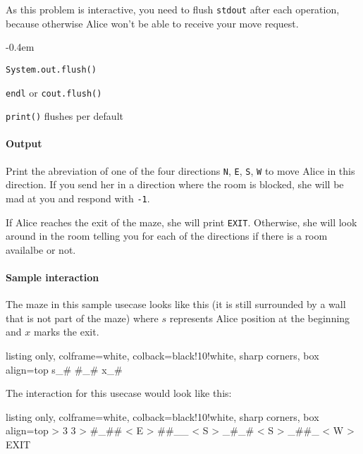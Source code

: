 As this problem is interactive, you need to flush \texttt{stdout} after each operation, because otherwise Alice won't be able to receive your move request.
\begin{description}
	\itemsep-0.4em
	\item[Java:] \texttt{System.out.flush()}
	\item[C++:] \texttt{endl} or \texttt{cout.flush()}
  \item[Python] \texttt{print()} flushes per default
\end{description}

\paragraph*{Output}

Print the abreviation of one of the four directions \texttt{N}, \texttt{E}, \texttt{S}, \texttt{W} to move Alice in this direction. If you send her in a direction where the room is blocked, she will be mad at you and respond with \texttt{-1}.

If Alice reaches the exit of the maze, she will print \texttt{EXIT}. Otherwise, she will look around in the room telling you for each of the directions if there is a room availalbe or not.

\paragraph*{Sample interaction}

The maze in this sample usecase looks like this (it is still surrounded by a wall that is not part of the maze) where $s$ represents Alice position at the beginning and $x$ marks the exit.
\noindent\begin{tcblisting}{listing only, colframe=white, colback=black!10!white, sharp corners, box align=top}
s_#
#_#
x_#
\end{tcblisting}

The interaction for this usecase would look like this:

\noindent\begin{tcblisting}{listing only, colframe=white, colback=black!10!white, sharp corners, box align=top}
> 3 3
> #_##
< E
> ##__
< S
> _#_#
< S
> _##_
< W
> EXIT
\end{tcblisting}

